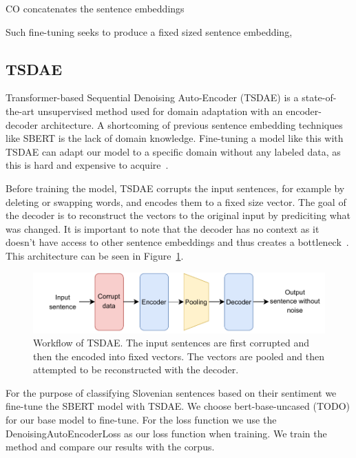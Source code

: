 \documentclass[fleqn,moreauthors,10pt]{ds_report}
\begin{document}
CO concatenates the sentence embeddings 

Such fine-tuning seeks to produce a fixed sized sentence embedding, 


\subsection*{TSDAE}

Transformer-based Sequential Denoising Auto-Encoder (TSDAE) is a state-of-the-art unsupervised method used for domain adaptation with an encoder-decoder architecture. A shortcoming of previous sentence embedding techniques like SBERT is the lack of domain knowledge. Fine-tuning a model like this with TSDAE can adapt our model to a specific domain without any labeled data, as this is hard and expensive to acquire~\cite{wang-etal-2021-tsdae-using}. 

Before training the model, TSDAE corrupts the input sentences, for example by deleting or swapping words, and encodes them to a fixed size vector. The goal of the decoder is to reconstruct the vectors to the original input by prediciting what was changed. It is important to note that the decoder has no context as it doesn't have access to other sentence embeddings and thus creates a bottleneck~\cite{wang-etal-2021-tsdae-using}. This architecture can be seen in Figure~\ref{fig:tsdae}.

\begin{figure}[ht]\centering
	\vspace{12 pt}
	\includegraphics[width=\linewidth]{TSDAE_scheme.pdf}
	\vspace{5 pt}
	\caption{Workflow of TSDAE. The input sentences are first corrupted and then the encoded into fixed vectors. The vectors are pooled and then attempted to be reconstructed with the decoder.}
	\label{fig:tsdae}
\end{figure}

For the purpose of classifying Slovenian sentences based on their sentiment we fine-tune the SBERT model with TSDAE. We choose bert-base-uncased (TODO) for our base model to fine-tune. For the loss function we use the DenoisingAutoEncoderLoss as our loss function when training. We train the method and compare our results with the corpus.
\end{document}
